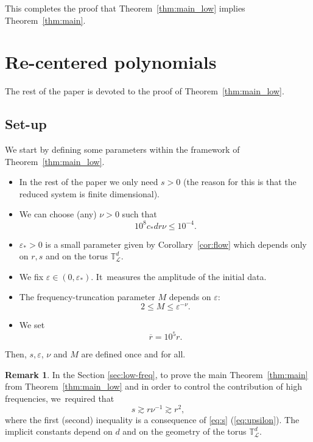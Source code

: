 \documentclass[JEP,XML,SOM,Unicode,published]{cedram}
\theoremstyle{plain}
\theoremstyle{definition}
\newtheorem{remark}[theorem]{Remark}
\newcommand{\T}{\mathbb{T}}
\newcommand{\1}{\mathbf{1}}
\let\epsilon\varepsilon
\begin{document}
This completes the proof that Theorem~\ref{thm:main_low} implies Theorem~\ref{thm:main}.

\section{Re-centered polynomials}
\label{sec:small-div}

The rest of the paper is devoted to the proof of Theorem~\ref{thm:main_low}.

\subsection{Set-up}
\label{sec:su}
We start by defining some parameters within the framework of Theorem~\ref{thm:main_low}.

\begin{itemize}
\item In the rest of the paper we only need $s>0$ (the reason for this is that the reduced system is finite dimensional).
\item We can choose (any) $\nu>0$ such that
\begin{equation}
\label{eq:upsilon}
10^{8}c_{\ast} d r \nu \leq 10^{-4}.
\end{equation}

\item $\epsilon_{\ast}>0$ is a small parameter given by Corollary~\ref{cor:flow} which depends only on $r, s$ and on the torus $\T^{d}_{\mathscr{L}}$.
\item We fix $\epsilon\in(0,\epsilon_{\ast})$. It~measures the amplitude of the initial data.
\item The frequency-truncation parameter $M$ depends on $\epsilon$:\vspace*{-3pt}
\[
2\leq M\leq \epsilon^{-\nu}.
\]
\item We set\vspace*{-3pt}
\[
\overline{r} = 10^{5}r.
\]
\end{itemize}
Then, $s, \epsilon$, $\nu$ and $M$ are defined once and for all.
\begin{remark}
In the Section \ref{sec:low-freq}, to prove the main Theorem~\ref{thm:main} from Theorem~\ref{thm:main_low} and in order to control the contribution of high frequencies, we~required that\vspace*{-3pt}
\[
s\gtrsim r\nu^{-1} \gtrsim r^{2},
\]
where the first (\resp second) inequality is a consequence of \eqref{eq:s} (\resp \eqref{eq:upsilon}). The implicit constants depend on $d$ and on the geometry of the torus $\T_{\mathscr{L}}^{d}$.
\end{remark}
\end{document}
